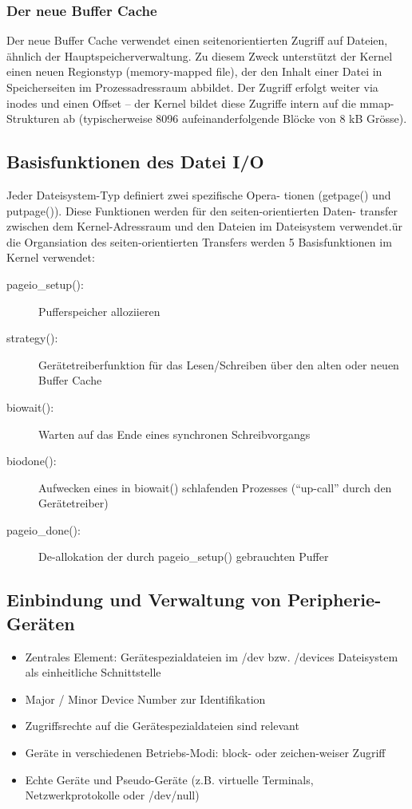 \documentclass[a4paper, 10pt]{article}
\begin{document}
\subsubsection{Der neue Buffer Cache}
Der neue Buffer Cache verwendet einen seitenorientierten Zugriff auf Dateien, ähnlich der Hauptspeicherverwaltung. Zu diesem Zweck unterstützt der Kernel einen neuen Regionstyp (memory-mapped file), der den Inhalt einer Datei in Speicherseiten im Prozessadressraum abbildet. Der Zugriff erfolgt weiter via inodes und einen Offset – der Kernel bildet diese Zugriffe intern auf die mmap- Strukturen ab (typischerweise 8096 aufeinanderfolgende
Blöcke von 8 kB Grösse).

\subsection{Basisfunktionen des Datei I/O}
Jeder Dateisystem-Typ definiert zwei spezifische Opera- tionen (getpage() und putpage()). Diese Funktionen werden für den seiten-orientierten Daten- transfer zwischen dem Kernel-Adressraum und den Dateien im Dateisystem verwendet.ür die Organsiation des seiten-orientierten Transfers werden 5 Basisfunktionen im Kernel verwendet:
\begin{description}
	\item[pageio\_setup():] Pufferspeicher alloziieren
	\item[strategy():] Gerätetreiberfunktion für das Lesen/Schreiben über den alten oder neuen
Buffer Cache
	\item[biowait():] Warten auf das Ende eines synchronen Schreibvorgangs
	\item[biodone():] Aufwecken eines in biowait() schlafenden Prozesses (“up-call” durch den Gerätetreiber)
	\item[pageio\_done():] De-allokation der durch pageio\_setup() gebrauchten Puffer
\end{description}

\subsection{Einbindung und Verwaltung von Peripherie-Geräten}
\begin{itemize}
	\item Zentrales Element: Gerätespezialdateien im /dev bzw. /devices Dateisystem als einheitliche Schnittstelle
	\item Major / Minor Device Number zur Identifikation
	\item Zugriffsrechte auf die Gerätespezialdateien sind relevant
	\item Geräte in verschiedenen Betriebs-Modi: block- oder zeichen-weiser Zugriff
	\item Echte Geräte und Pseudo-Geräte (z.B. virtuelle Terminals, Netzwerkprotokolle oder /dev/null)
\end{itemize}
\end{document}

